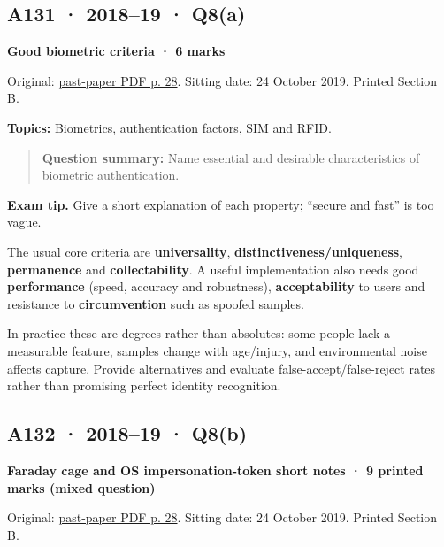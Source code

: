 \documentclass[11pt,a4paper]{article}
\begin{document}
\clearpage
\subsection{A131 · 2018–19 · Q8(a)}\label{a131}

\textbf{Good biometric criteria · 6 marks}


Original: \href{../../CSE405-Security_Merged.pdf\#page=28}{past-paper PDF p. 28}. Sitting date: 24 October 2019. Printed Section B.


\textbf{Topics:} Biometrics,\allowbreak{} authentication factors,\allowbreak{} SIM and RFID.



\begin{quote}\small

\textbf{Question summary:} Name essential and desirable characteristics of biometric authentication.



\end{quote}


{\color{ForestGreen}\textbf{Exam tip.} Give a short explanation of each property; “secure and fast” is too vague.}


The usual core criteria are \textbf{universality},\allowbreak{} \textbf{distinctiveness/\allowbreak{}uniqueness},\allowbreak{} \textbf{permanence} and \textbf{collectability}. A useful implementation also needs good \textbf{performance} (speed,\allowbreak{} accuracy and robustness),\allowbreak{} \textbf{acceptability} to users and resistance to \textbf{circumvention} such as spoofed samples.


In practice these are degrees rather than absolutes: some people lack a measurable feature,\allowbreak{} samples change with age/\allowbreak{}injury,\allowbreak{} and environmental noise affects capture. Provide alternatives and evaluate false-accept/\allowbreak{}false-reject rates rather than promising perfect identity recognition.




\clearpage
\subsection{A132 · 2018–19 · Q8(b)}\label{a132}

\textbf{Faraday cage and OS impersonation-token short notes · 9 printed marks (mixed question)}


Original: \href{../../CSE405-Security_Merged.pdf\#page=28}{past-paper PDF p. 28}. Sitting date: 24 October 2019. Printed Section B.
\end{document}
